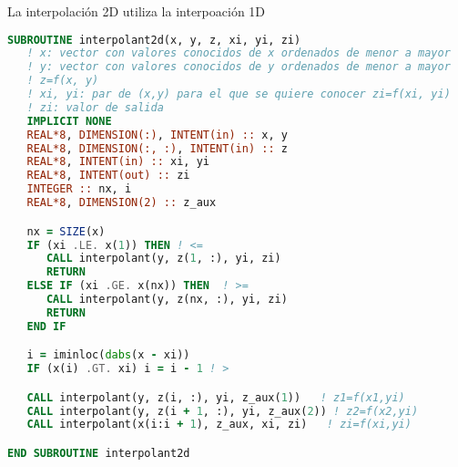 La interpolación 2D utiliza la interpoación 1D
\begin{lstlisting}[basicstyle=\scriptsize, language=fortran, caption=Interpolación 2D]
SUBROUTINE interpolant2d(x, y, z, xi, yi, zi)
   ! x: vector con valores conocidos de x ordenados de menor a mayor
   ! y: vector con valores conocidos de y ordenados de menor a mayor
   ! z=f(x, y)
   ! xi, yi: par de (x,y) para el que se quiere conocer zi=f(xi, yi)
   ! zi: valor de salida
   IMPLICIT NONE
   REAL*8, DIMENSION(:), INTENT(in) :: x, y
   REAL*8, DIMENSION(:, :), INTENT(in) :: z
   REAL*8, INTENT(in) :: xi, yi
   REAL*8, INTENT(out) :: zi
   INTEGER :: nx, i
   REAL*8, DIMENSION(2) :: z_aux

   nx = SIZE(x)
   IF (xi .LE. x(1)) THEN ! <=
      CALL interpolant(y, z(1, :), yi, zi)
      RETURN
   ELSE IF (xi .GE. x(nx)) THEN  ! >=
      CALL interpolant(y, z(nx, :), yi, zi)
      RETURN
   END IF

   i = iminloc(dabs(x - xi))
   IF (x(i) .GT. xi) i = i - 1 ! >

   CALL interpolant(y, z(i, :), yi, z_aux(1))   ! z1=f(x1,yi)
   CALL interpolant(y, z(i + 1, :), yi, z_aux(2)) ! z2=f(x2,yi)
   CALL interpolant(x(i:i + 1), z_aux, xi, zi)   ! zi=f(xi,yi)

END SUBROUTINE interpolant2d
\end{lstlisting}





